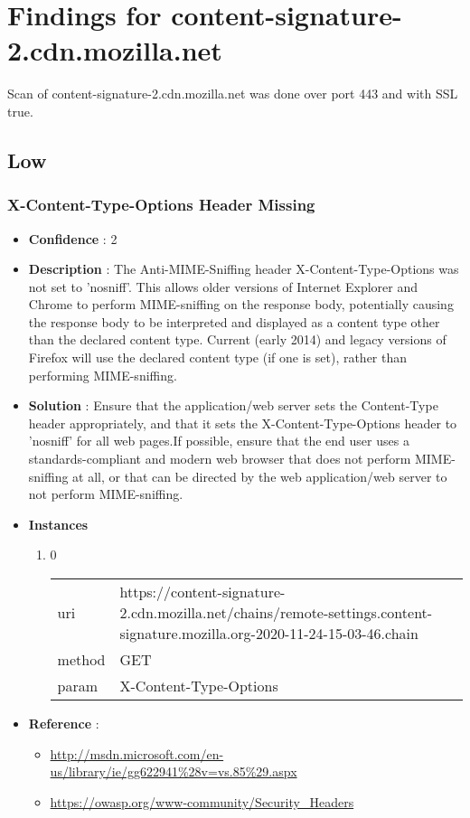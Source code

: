 \documentclass[10pt]{article}
\begin{document}
\section{Findings for content-signature-2.cdn.mozilla.net}
Scan of content-signature-2.cdn.mozilla.net was done over port 443 and with SSL true.
\subsection{Low}
\subsubsection{X-Content-Type-Options Header Missing}
\begin{itemize}
\item[] \textbf{Confidence} : 2
\item[] \textbf{Description} : The Anti-MIME-Sniffing header X-Content-Type-Options was not set to 'nosniff'. This allows older versions of Internet Explorer and Chrome to perform MIME-sniffing on the response body, potentially causing the response body to be interpreted and displayed as a content type other than the declared content type. Current (early 2014) and legacy versions of Firefox will use the declared content type (if one is set), rather than performing MIME-sniffing.
\item[] \textbf{Solution} :  Ensure that the application/web server sets the Content-Type header appropriately, and that it sets the X-Content-Type-Options header to 'nosniff' for all web pages.If possible, ensure that the end user uses a standards-compliant and modern web browser that does not perform MIME-sniffing at all, or that can be directed by the web application/web server to not perform MIME-sniffing.
\item[] \textbf{Instances}
\begin{enumerate}
\item[] 0
\begin{tabular}{| l | p{12cm}}
uri & https://content-signature-2.cdn.mozilla.net/chains/remote-settings.content-signature.mozilla.org-2020-11-24-15-03-46.chain \\
method & GET \\
param & X-Content-Type-Options \\
\end{tabular}
\end{enumerate}
\item[] \textbf{Reference} : 
\begin{itemize}
\item \url{http://msdn.microsoft.com/en-us/library/ie/gg622941\%28v=vs.85\%29.aspx}
\item \url{https://owasp.org/www-community/Security\_Headers}
\end{itemize}
\end{itemize}
\end{document}
